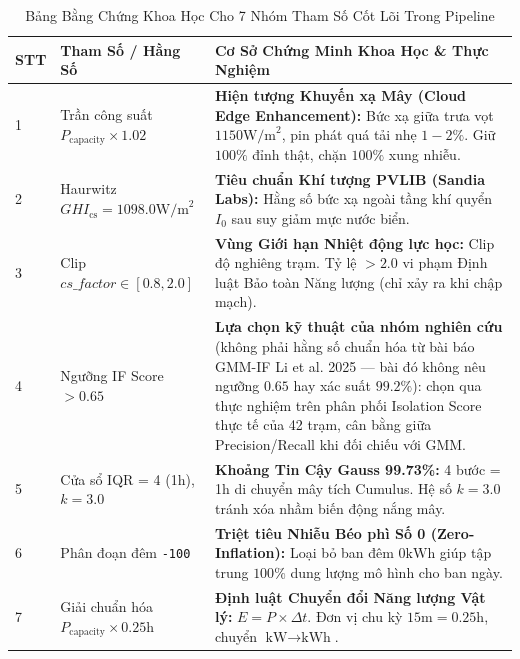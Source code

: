 \documentclass[12pt,a4paper]{article}
\begin{document}
\begin{table}[htbp]
\centering
\caption{Bảng Bằng Chứng Khoa Học Cho 7 Nhóm Tham Số Cốt Lõi Trong Pipeline}
\label{tab:hardcoded_params_proof}
\small
\begin{tabularx}{\linewidth}{l l X}
\toprule
\textbf{STT} & \textbf{Tham Số / Hằng Số} & \textbf{Cơ Sở Chứng Minh Khoa Học \& Thực Nghiệm} \\
\midrule
1 & Trần công suất $P_{\text{capacity}} \times 1.02$ & \textbf{Hiện tượng Khuyến xạ Mây (Cloud Edge Enhancement):} Bức xạ giữa trưa vọt $1150\text{W/m}^2$, pin phát quá tải nhẹ $1-2\%$. Giữ $100\%$ đỉnh thật, chặn $100\%$ xung nhiễu. \\
2 & Haurwitz $GHI_{\text{cs}} = 1098.0\text{W/m}^2$ & \textbf{Tiêu chuẩn Khí tượng PVLIB (Sandia Labs):} Hằng số bức xạ ngoài tầng khí quyển $I_0$ sau suy giảm mực nước biển. \\
3 & Clip $cs\_factor \in [0.8, 2.0]$ & \textbf{Vùng Giới hạn Nhiệt động lực học:} Clip độ nghiêng trạm. Tỷ lệ $> 2.0$ vi phạm Định luật Bảo toàn Năng lượng (chỉ xảy ra khi chập mạch). \\
4 & Ngưỡng IF Score $> 0.65$ & \textbf{Lựa chọn kỹ thuật của nhóm nghiên cứu} (không phải hằng số chuẩn hóa từ bài báo GMM-IF Li et al. 2025 — bài đó không nêu ngưỡng $0.65$ hay xác suất $99.2\%$): chọn qua thực nghiệm trên phân phối Isolation Score thực tế của 42 trạm, cân bằng giữa Precision/Recall khi đối chiếu với GMM. \\
5 & Cửa sổ IQR = 4 (1h), $k = 3.0$ & \textbf{Khoảng Tin Cậy Gauss 99.73\%:} 4 bước = 1h di chuyển mây tích Cumulus. Hệ số $k=3.0$ tránh xóa nhầm biến động nắng mây. \\
6 & Phân đoạn đêm \texttt{-100} & \textbf{Triệt tiêu Nhiễu Béo phì Số 0 (Zero-Inflation):} Loại bỏ ban đêm $0\text{kWh}$ giúp tập trung $100\%$ dung lượng mô hình cho ban ngày. \\
7 & Giải chuẩn hóa $P_{\text{capacity}} \times 0.25\text{h}$ & \textbf{Định luật Chuyển đổi Năng lượng Vật lý:} $E = P \times \Delta t$. Đơn vị chu kỳ $15\text{m} = 0.25\text{h}$, chuyển $\text{kW} \rightarrow \text{kWh}$. \\
\bottomrule
\end{tabularx}
\end{table}
\end{document}
